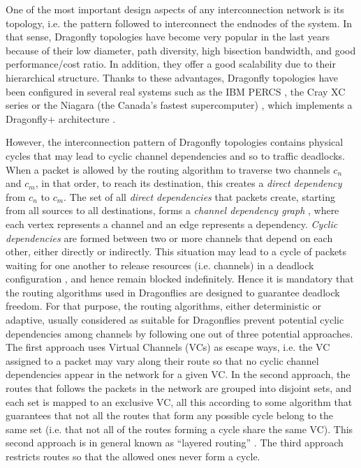 \documentclass[review]{elsarticle}
\newcommand{\dflys}{Dragonflies}
\newcommand{\dfly}{Dragonfly}
\begin{document}
One of the most important design aspects of any interconnection network is its topology, i.e. the pattern followed to interconnect the endnodes of the system.
In that sense, \dfly{} topologies \cite{kim_technology-driven_2008}
have become very popular in the last years because of their low diameter, path diversity, high bisection bandwidth, and good performance/cost ratio.
In addition, they offer a good scalability due to their hierarchical structure.
Thanks to these advantages, \dfly{} topologies have been configured in several real systems such as the IBM PERCS \cite{percs_2010}, the Cray XC series \cite{faanes_cray_2012}
or the Niagara (the Canada's fastest supercomputer) \cite{niagara}, which implements a \dfly$+$ architecture \cite{dflyplus2017}.

However, the interconnection pattern of \dfly{} topologies contains physical cycles that may lead to cyclic channel dependencies and so to traffic deadlocks.
When a packet  is allowed by the routing algorithm to traverse  two channels $c_n$ and $c_m$, in that order, to reach its destination, this creates a \emph{direct dependency} from $c_n$ to $c_m$. The set of all \emph{direct dependencies} that packets create, starting from all sources to all destinations, forms a \emph{channel dependency graph} \cite{dally87_vc}, where each vertex represents a channel and an edge represents a dependency. \emph{Cyclic dependencies} are formed between two or more channels that depend on each other, either directly or indirectly.
This situation may lead to a cycle of packets waiting for one another to release resources (i.e. channels) in a deadlock configuration \cite{dally_principles_2003}, and hence remain blocked indefinitely.
Hence it is mandatory that the routing algorithms used in \dflys{} are designed to guarantee deadlock freedom.
For that purpose, the routing algorithms, either deterministic or adaptive, usually considered as suitable for \dflys{} prevent
potential cyclic dependencies among channels \cite{dally87_vc} by following one out of three potential approaches.
The first approach uses Virtual Channels (VCs) \cite{dally87_vc} as escape ways, i.e. the VC assigned to a packet
may vary along their route so that no cyclic channel dependencies appear in the network for a given VC.
In the second approach, the routes that follows the packets in the network are grouped into disjoint sets, and each set is mapped to an exclusive VC, all this according to some algorithm that guarantees that
not all the routes that form any possible cycle belong to the same set (i.e. that not all of the routes forming a cycle share the same VC).
This second approach is in general known as ``layered routing'' \cite{skeie2002_lash}.
The third approach restricts routes so that the allowed ones never form a cycle.
\end{document}
